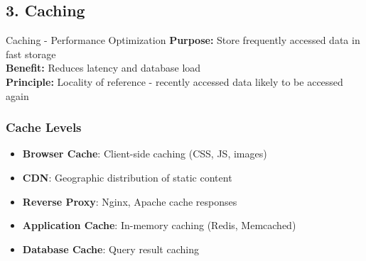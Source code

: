 \documentclass[10pt,a4paper]{article}
\begin{document}
\subsection{3. Caching}

\begin{conceptbox}{Caching - Performance Optimization}
\textbf{Purpose:} Store frequently accessed data in fast storage\\
\textbf{Benefit:} Reduces latency and database load\\
\textbf{Principle:} Locality of reference - recently accessed data likely to be accessed again
\end{conceptbox}

\subsubsection{Cache Levels}
\begin{itemize}
\item \textbf{Browser Cache}: Client-side caching (CSS, JS, images)
\item \textbf{CDN}: Geographic distribution of static content
\item \textbf{Reverse Proxy}: Nginx, Apache cache responses
\item \textbf{Application Cache}: In-memory caching (Redis, Memcached)
\item \textbf{Database Cache}: Query result caching
\end{itemize}
\end{document}
